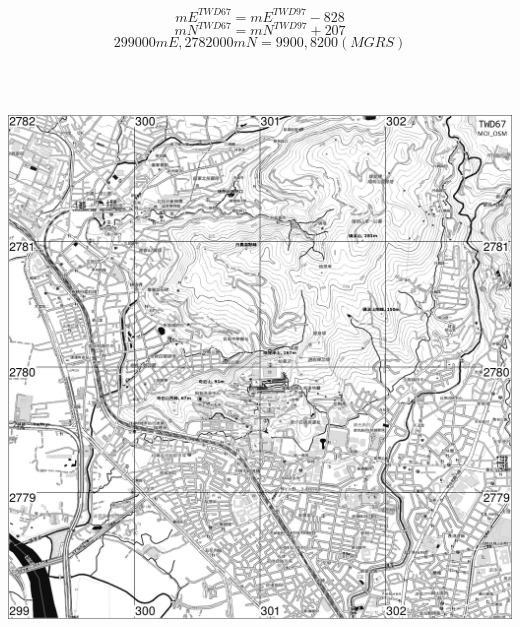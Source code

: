 \documentclass{article}
\begin{document}
\begin{multicols}{2}
\begin{equation} 
	mE^{TWD67 }= mE^{TWD97} - 828 
\end{equation} 
\begin{equation} 
	mN^{TWD67 }= mN^{TWD97} + 207
\end{equation} 
\begin{equation} 
	299000mE, 2782000mN = 9900, 8200 (MGRS)	
\end{equation} 

\includegraphics[width=16cm, height=16cm]{osm-map.png}


\end{multicols}
\end{document}
